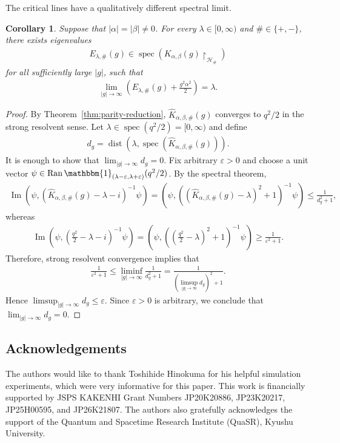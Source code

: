 \documentclass[12pt,dvipdfmx]{article}
\newtheorem{corollary}[theorem]{Corollary}
\newcommand{\eps}{\varepsilon}
\newcommand{\one}{\mathbbm{1}}
\newcommand{\cH}{\mathcal{H}}
\begin{document}
%
The critical lines have a qualitatively different spectral limit.
%
\begin{corollary}\label{col:critical_spectrum}
Suppose that $|\alpha|=|\beta|\ne0$. For every $\lambda\in[0,\infty)$ and $\#\in\{+,-\}$, there exists  eigenvalues
\begin{align*}
    E_{\lambda,\#}(g)
    \in
    \operatorname{spec} 
    \left(
        K_{\alpha,\beta}(g) \upharpoonright_{\cH _\#}
    \right)
\end{align*}
for all sufficiently large $|g|$, such that
\begin{align*}
    \lim_{|g|\to\infty}
    \left(
        E_{\lambda,\#}(g) + \frac{g^2\alpha^2}{2}
    \right)
    = \lambda.
\end{align*}
\end{corollary}
%
\begin{proof}
By Theorem~\ref{thm:parity-reduction}, $\hat{K}_{\alpha,\beta,\#}(g)$ converges  to $q^2/2$ in the strong resolvent sense. 
Let $\lambda\in\operatorname{spec}(q^2/2)=[0,\infty)$ and define
\begin{align*}
    d_g 
    = 
    \operatorname{dist} 
    \left(
        \lambda, \operatorname{spec} (\hat{K}_{\alpha,\beta,\#}(g))
    \right).
\end{align*}
It is enough to show that $\lim_{|g|\to\infty}d_g=0$. Fix arbitrary $\eps>0$ and choose a unit vector
$
    \psi
    \in
    \operatorname{Ran} \one_{(\lambda - \eps, \lambda + \eps)}(q^2 / 2)$. 
By the spectral theorem,
\begin{align*}
    \operatorname{Im}
    \left(\psi, (\hat{K}_{\alpha,\beta,\#}(g) - \lambda - i)^{-1}\psi\right)
    =
    \left(\psi, ((\hat{K}_{\alpha,\beta,\#}(g) - \lambda)^2 + 1)^{-1}\psi\right)
    \le 
    \frac{1}{d_g^2 + 1},
\end{align*}
whereas
\begin{align*}
    \operatorname{Im}
    \left(\psi, \left(\frac{q^2}{2} - \lambda - i\right)^{-1}\psi\right)
    =
    \left(\psi, \left(\left(\frac{q^2}{2} - \lambda\right)^2 + 1\right)^{-1}\psi\right)
    \ge 
    \frac{1}{\eps^2 + 1}.
\end{align*}
Therefore, strong resolvent convergence implies that
\begin{align*}
    \frac{1}{\eps^2 + 1}
    \le
    \liminf_{|g|\to\infty} \frac{1}{d_g^2 + 1}
    =
    \frac{1}{(\limsup_{|g|\to\infty} d_g)^2 + 1}.
\end{align*}
Hence $\limsup_{|g|\to\infty} d_g \le \eps$. Since $\eps>0$ is arbitrary, we conclude that $\lim_{|g|\to\infty}d_g=0$.
\end{proof}
%
%
\subsection*{Acknowledgements}
%
%
The authors would like to thank Toshihide Hinokuma for his helpful simulation experiments, 
which were very informative for this paper.  This work is financially supported by JSPS KAKENHI Grant Numbers JP20K20886, JP23K20217, JP25H00595, and JP26K21807.
The authors also gratefully acknowledges the support of the Quantum and
Spacetime Research Institute (QuaSR), Kyushu University.%
%
%
%
%


%
%
%
\end{document}
